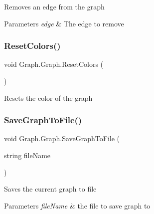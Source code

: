 Removes an edge from the graph 


\begin{DoxyParams}{Parameters}
{\em edge} & The edge to remove\\
\hline
\end{DoxyParams}
\mbox{\label{class_graph_1_1_graph_a74876b10cb94ff9f17ef17c674cc14d2}} 
\subsubsection{\texorpdfstring{Reset\+Colors()}{ResetColors()}}
{\footnotesize\ttfamily void Graph.\+Graph.\+Reset\+Colors (\begin{DoxyParamCaption}{ }\end{DoxyParamCaption})}



Resets the color of the graph 

\mbox{\label{class_graph_1_1_graph_a7046489eb0f0149305bd361dd84c34a1}} 
\subsubsection{\texorpdfstring{Save\+Graph\+To\+File()}{SaveGraphToFile()}}
{\footnotesize\ttfamily void Graph.\+Graph.\+Save\+Graph\+To\+File (\begin{DoxyParamCaption}\item[{string}]{file\+Name }\end{DoxyParamCaption})}



Saves the current graph to file 


\begin{DoxyParams}{Parameters}
{\em file\+Name} & the file to save graph to\\
\hline
\end{DoxyParams}
\mbox{\label{class_graph_1_1_graph_a156e417443003071243e2a22ba0a1533}} 
